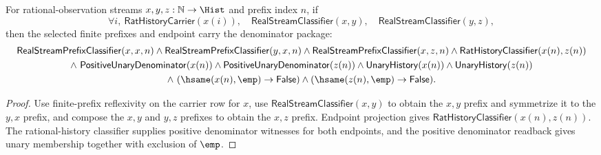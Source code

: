 \begin{theorem}
\label{thm:real-stream-classifier-finite-prefix-endpoint-denominator-package}
For rational-observation streams \(x,y,z:\mathbb{N}\to\Hist\) and prefix index
\(n\), if
$$
\forall i,\ \mathsf{RatHistoryCarrier}(x(i)),\quad
\mathsf{RealStreamClassifier}(x,y),\quad
\mathsf{RealStreamClassifier}(y,z),
$$
then the selected finite prefixes and endpoint carry the denominator package:
$$
\begin{gathered}
\mathsf{RealStreamPrefixClassifier}(x,x,n)
\land
\mathsf{RealStreamPrefixClassifier}(y,x,n)
\land
\mathsf{RealStreamPrefixClassifier}(x,z,n)
\land
\mathsf{RatHistoryClassifier}(x(n),z(n))\\
\land\ \mathsf{PositiveUnaryDenominator}(x(n))
\land
\mathsf{PositiveUnaryDenominator}(z(n))
\land
\mathsf{UnaryHistory}(x(n))
\land
\mathsf{UnaryHistory}(z(n))\\
\land\ (\hsame(x(n),\emp)\to\mathsf{False})
\land
(\hsame(z(n),\emp)\to\mathsf{False}).
\end{gathered}
$$
\end{theorem}
\begin{proof}
Use finite-prefix reflexivity on the carrier row for \(x\), use
\(\mathsf{RealStreamClassifier}(x,y)\) to obtain the \(x,y\) prefix and
symmetrize it to the \(y,x\) prefix, and compose the \(x,y\) and \(y,z\)
prefixes to obtain the \(x,z\) prefix. Endpoint projection gives
\(\mathsf{RatHistoryClassifier}(x(n),z(n))\). The rational-history classifier
supplies positive denominator witnesses for both endpoints, and the positive
denominator readback gives unary membership together with exclusion of
\(\emp\).
\end{proof}


